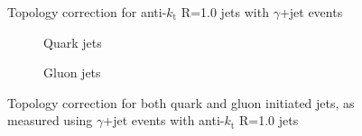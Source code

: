 \clearpage
\begin{figure}[!ht]
 \centering
 \caption[Topology correction for anti-$k_{\mathrm t}$ R=1.0 jets with $\gamma$+jet events]
 {\small Topology correction for anti-$k_{\mathrm t}$ R=1.0 jets with $\gamma$+jet events}
 \label{plot:GJetTopoCorr10App}
\end{figure}

\begin{figure}[!ht]
 \centering
 \begin{subfigure}{.5\textwidth}
  \centering
  \caption{Quark jets}
 \end{subfigure}%
 \begin{subfigure}{.5\textwidth}
  \centering
  \caption{Gluon jets}
 \end{subfigure}
 \caption[Quark/gluon jet topology correction, anti-$k_{\mathrm t}$ R=1.0, $\gamma$+jet]
 {\small Topology correction for both quark and gluon initiated jets, as measured using $\gamma$+jet events with anti-$k_{\mathrm t}$ R=1.0 jets}
 \label{plot:GJetTopoCorrFlav10App}
\end{figure}
